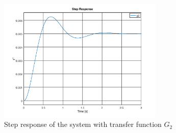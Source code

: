 \documentclass[12pt, a4paper]{article}
\begin{document}
			\begin{figure}[H]
				\centering
				\includegraphics[width=0.7\textwidth]{Images/pole_plot_pre_q1b_step_g2.png}
				\caption{Step response of the system with transfer function $G_2$}
				\label{fig:pole_plot_pre_q1b_step_g2}
			\end{figure}


		




		
	
\end{document}

